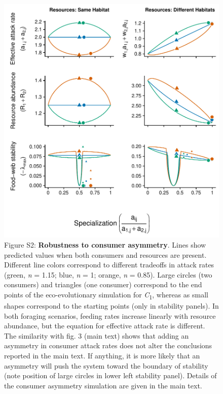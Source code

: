 \documentclass[11pt,]{article}
\begin{document}
\begin{figure}
\centering
\includegraphics{asymm_figs.pdf}
\caption{Figure S2: \textbf{Robustness to consumer asymmetry}. Lines
show predicted values when both consumers and resources are present.
Different line colors correspond to different tradeoffs in attack rates
(green, \emph{n} = 1.15; blue, \emph{n} = 1; orange, \emph{n} = 0.85).
Large circles (two consumers) and triangles (one consumer) correspond to
the end points of the eco-evolutionary simulation for
\emph{C}\textsubscript{1}, whereas as small shapes correspond to the
starting points (only in stability panels). In both foraging scenarios,
feeding rates increase linearly with resource abundance, but the
equation for effective attack rate is different. The similarity with
fig. 3 (main text) shows that adding an asymmetry in consumer attack
rates does not alter the conclusions reported in the main text. If
anything, it is more likely that an asymmetry will push the system
toward the boundary of stability (note position of large circles in
lower left stability panel). Details of the consumer asymmetry
simulation are given in the main text.}
\end{figure}
\end{document}
